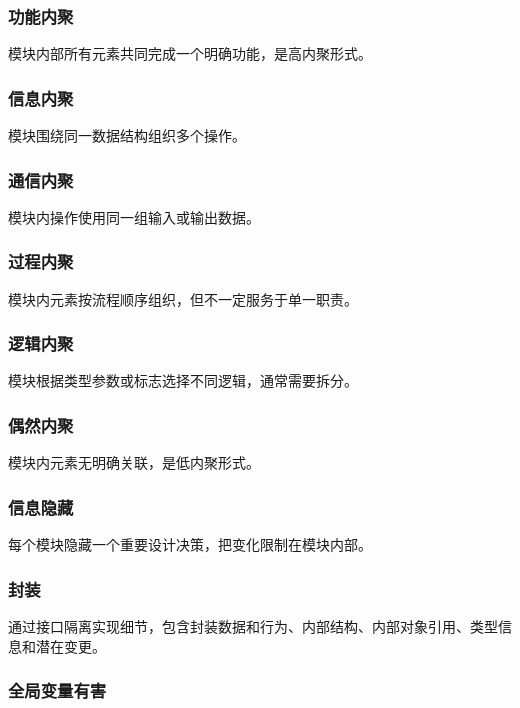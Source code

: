 \documentclass[UTF8,zihao=-4]{ctexart}
\begin{document}
\subsubsection*{功能内聚}


模块内部所有元素共同完成一个明确功能，是高内聚形式。


\subsubsection*{信息内聚}


模块围绕同一数据结构组织多个操作。


\subsubsection*{通信内聚}


模块内操作使用同一组输入或输出数据。


\subsubsection*{过程内聚}


模块内元素按流程顺序组织，但不一定服务于单一职责。


\subsubsection*{逻辑内聚}


模块根据类型参数或标志选择不同逻辑，通常需要拆分。


\subsubsection*{偶然内聚}


模块内元素无明确关联，是低内聚形式。


\subsubsection*{信息隐藏}


每个模块隐藏一个重要设计决策，把变化限制在模块内部。


\subsubsection*{封装}


通过接口隔离实现细节，包含封装数据和行为、内部结构、内部对象引用、类型信息和潜在变更。


\subsubsection*{全局变量有害}
\end{document}
